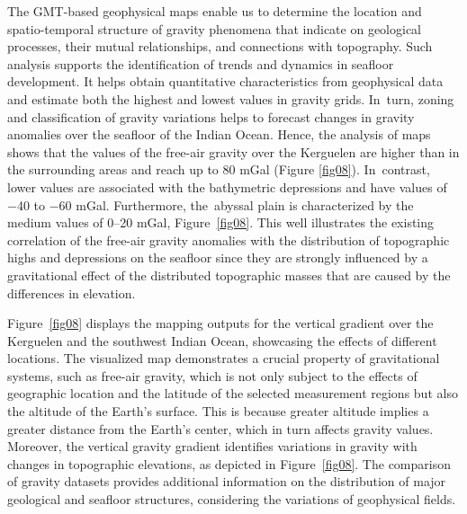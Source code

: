 \documentclass[geomatics,article,accept,pdftex,moreauthors]{Definitions/mdpi}
\begin{document}
The GMT-based geophysical maps enable us to determine the location and spatio-temporal structure of gravity phenomena that indicate on geological processes, their mutual relationships, and connections with topography. Such analysis supports the identification of trends and dynamics in seafloor development. It helps obtain quantitative characteristics from geophysical data and estimate both the highest and lowest values in gravity grids. In~turn, zoning and classification of gravity variations helps to forecast changes in gravity anomalies over the seafloor of the Indian Ocean. Hence, the analysis of maps shows that the values of the free-air gravity over the Kerguelen are higher than in the surrounding areas and reach up to 80 mGal (Figure \ref{fig08}). In~contrast, lower values are associated with the bathymetric depressions and have values of $-$40 to $-$60 mGal. Furthermore, the~abyssal plain is characterized by the medium values of 0--20 mGal, Figure~\ref{fig08}. This well illustrates the existing correlation of the free-air gravity anomalies with the distribution of topographic highs and depressions on the seafloor since they are strongly influenced by a gravitational effect of the distributed topographic masses that are caused by the differences in elevation. 

Figure~\ref{fig08} displays the mapping outputs for the vertical gradient over the Kerguelen and the southwest Indian Ocean, showcasing the effects of different locations. The visualized map demonstrates a crucial property of gravitational systems, such as free-air gravity, which is not only subject to the effects of geographic location and the latitude of the selected measurement regions but also the altitude of the Earth's surface. This is because greater altitude implies a greater distance from the Earth's center, which in turn affects gravity values. Moreover, the vertical gravity gradient identifies variations in gravity with changes in topographic elevations, as depicted in Figure~\ref{fig08}. The comparison of gravity datasets provides additional information on the distribution of major geological and seafloor structures, considering the variations of geophysical fields.

\end{document}
